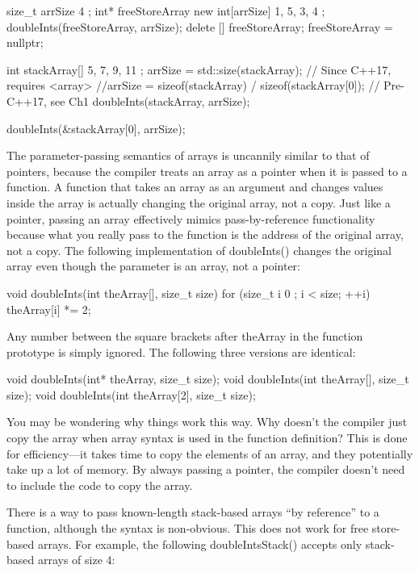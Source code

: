 \begin{cpp}
size_t arrSize { 4 };
int* freeStoreArray { new int[arrSize]{ 1, 5, 3, 4 } };
doubleInts(freeStoreArray, arrSize);
delete [] freeStoreArray;
freeStoreArray = nullptr;

int stackArray[] { 5, 7, 9, 11 };
arrSize = std::size(stackArray); // Since C++17, requires <array>
//arrSize = sizeof(stackArray) / sizeof(stackArray[0]); // Pre-C++17, see Ch1
doubleInts(stackArray, arrSize);

doubleInts(&stackArray[0], arrSize);
\end{cpp}

The parameter-passing semantics of arrays is uncannily similar to that of pointers, because the compiler treats an array as a pointer when it is passed to a function. A function that takes an array as an argument and changes values inside the array is actually changing the original array, not a copy. Just like a pointer, passing an array effectively mimics pass-by-reference functionality because what you really pass to the function is the address of the original array, not a copy. The following implementation of doubleInts() changes the original array even though the parameter is an array, not a pointer:

\begin{cpp}
void doubleInts(int theArray[], size_t size)
{
    for (size_t i { 0 }; i < size; ++i) { theArray[i] *= 2; }
}
\end{cpp}

Any number between the square brackets after theArray in the function prototype is simply ignored. The following three versions are identical:

\begin{cpp}
void doubleInts(int* theArray, size_t size);
void doubleInts(int theArray[], size_t size);
void doubleInts(int theArray[2], size_t size);
\end{cpp}

You may be wondering why things work this way. Why doesn’t the compiler just copy the array when array syntax is used in the function definition? This is done for efficiency—it takes time to copy the elements of an array, and they potentially take up a lot of memory. By always passing a pointer, the compiler doesn’t need to include the code to copy the array.

There is a way to pass known-length stack-based arrays “by reference” to a function, although the syntax is non-obvious. This does not work for free store-based arrays. For example, the following doubleIntsStack() accepts only stack-based arrays of size 4:

